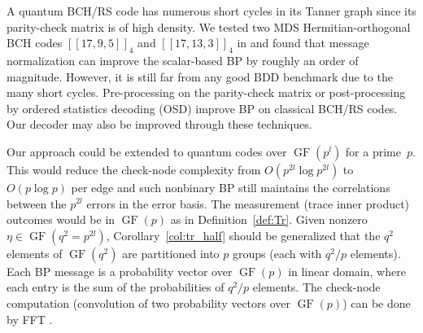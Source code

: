 \documentclass{ieeeaccess}
\DeclareMathOperator{\GF}{GF}
\theoremstyle{definition}		%
\begin{document}
A quantum BCH/RS code \cite{GGB99,GB99,AKS07,LaGua14} has numerous short cycles in its Tanner graph since its parity-check matrix is of high density.
We tested two MDS Hermitian-orthogonal BCH codes $[[17,9,5]]_4$ and $[[17,13,3]]_4$ in \cite{LaGua14} and found that message normalization can improve the scalar-based BP by roughly an order of magnitude.
However, it is still far from any good BDD benchmark due to the many short cycles.
%
Pre-processing on the parity-check matrix \cite{LALL17,LALL20} or post-processing by ordered statistics decoding (OSD) \cite{JN06,EM06} improve BP on classical BCH/RS codes. 
Our decoder may also be improved through these techniques.



Our approach could be extended to quantum codes over $\GF(p^l)$ for a prime~$p$.
This would reduce the check-node complexity from $O(p^{2l}\log p^{2l})$ to $O(p\log p)$ per edge 
and such nonbinary BP still maintains the correlations between the $p^{2l}$ errors in the error basis.
%
The measurement (trace inner product) outcomes  would be in $\GF(p)$ as in Definition~\ref{def:Tr}.
Given nonzero $ \eta \in \GF(q^2=p^{2l}) $, Corollary~\ref{col:tr_half} should be generalized that the $q^2$ elements of $\GF(q^2)$ are partitioned into $p$ groups (each with $q^2/p$ elements). %
%
Each BP message is a probability vector over $\GF(p)$ in linear domain, where each entry is the sum of the probabilities of $q^2/p$ elements.
The check-node computation (convolution of two probability vectors over $\GF(p)$) can be done by FFT \cite{MD01,DF07}.










%
\end{document}
